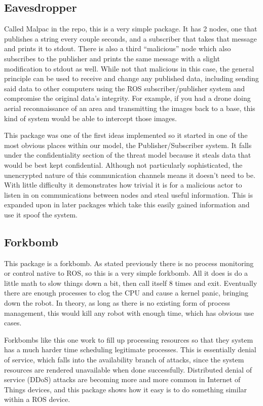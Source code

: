 \documentclass[IEEEtran,letterpaper,10pt,notitlepage,draftclsnofoot,onecolumn]{article}
\begin{document}
\subsection{Eavesdropper}
Called Malpac in the repo, this is a very simple package. It has 2 nodes, one that publishes a string every couple seconds, and 
a subscriber that takes that message and prints it to stdout. There is also a third “malicious” node which also subscribes to 
the publisher and prints the same message with a slight modification to stdout as well. While not that malicious in this case, 
the general principle can be used to receive and change any published data, including sending said data to other computers 
using the ROS subscriber/publisher system and compromise the original data’s integrity.
For example, if you had a drone doing aerial reconnaissance of an area and transmitting the images back to a base, this kind of 
system would be able to intercept those images.

This package was one of the first ideas implemented so it started in one of the most obvious places within our model, the Publisher/Subscriber system.
It falls under the confidentiality section of the threat model because it steals data that would be best kept confidential. 
Although not particularly sophisticated, the unencrypted nature of this communication channels means it doesn't need to be. 
With little difficulty it demonstrates how trivial it is for a malicious actor to listen in on communications between nodes and steal useful information.
This is expanded upon in later packages which take this easily gained information and use it spoof the system.

\subsection{Forkbomb}
This package is a forkbomb.
As stated previously there is no process monitoring or control native to ROS, so this is a very simple forkbomb. All it does is 
do a little math to slow things down a bit, then call itself 8 times and exit.
Eventually there are enough processes to clog the CPU and cause a kernel panic, bringing down the robot.
In theory, as long as there is no existing form of process management, this would kill any robot with enough time, which has 
obvious use cases.

Forkbombs like this one work to fill up processing resources so that they system has a much harder time scheduling legitimate processes. 
This is essentially denial of service, which falls into the availability branch of attacks, since the system resources are rendered unavailable when done successfully.
Distributed denial of service (DDoS) attacks are becoming more and more common in Internet of Things devices, and this package shows how it easy is to do something similar within a ROS device.
\end{document}
